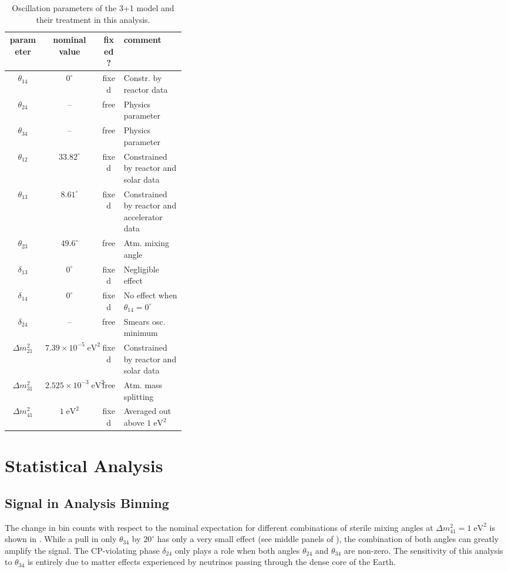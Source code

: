 \begin{table}
    \centering
    \begin{tabular}{@{}cccp{0.35 \linewidth}@{}}\toprule
        \textbf{parameter} & \textbf{nominal value} & \textbf{fixed?} & \textbf{comment} \\
        \midrule
        $\theta_{14}$ & $0^\circ$ & fixed &  Constr. by reactor data \\
        $\theta_{24}$ & -- & free & Physics parameter\\
        $\theta_{34}$ & -- & free & Physics parameter\\
        $\theta_{12}$ & $33.82^\circ$ & fixed & Constrained by reactor and solar data \\
        $\theta_{13}$ & $8.61^\circ$ & fixed & Constrained by reactor and accelerator data \\
        $\theta_{23}$ & $49.6^\circ$ & free & Atm. mixing angle \\
        $\delta_{13}$ & $0^\circ$ & fixed &  Negligible effect \\
        $\delta_{14}$ & $0^\circ$ & fixed &  No effect when $\theta_{14} = 0^\circ$ \\
        $\delta_{24}$ & -- & free & Smears osc. minimum \\
        $\Delta m^2_{21}$ & $7.39\times10^{-5}\;\mathrm{eV^2}$ & fixed & Constrained by reactor and solar data \\
        $\Delta m^2_{31}$ & $2.525\times10^{-3}\;\mathrm{eV^2}$ & free & Atm. mass splitting \\
        $\Delta m^2_{41}$ & $1\;\mathrm{eV^2}$ & fixed & Averaged out above $1\;\mathrm{eV^2}$ \\
        \bottomrule
    \end{tabular}
    \caption{Oscillation parameters of the 3+1 model and their treatment in this analysis.}
    \label{tab:oscillation-parameters}
\end{table}

\section{Statistical Analysis}

\subsection{Signal in Analysis Binning}
The change in bin counts with respect to the nominal expectation for different combinations of sterile mixing angles at $\Delta m^2_{41}=1\;\mathrm{eV^2}$ is shown in . While a pull in only $\theta_{34}$ by $20^\circ$ has only a very small effect (see middle panels of ), the combination of both angles can greatly amplify the signal. The CP-violating phase $\delta_{24}$ only plays a role when both angles $\theta_{24}$ and $\theta_{34}$ are non-zero. The sensitivity of this analysis to $\theta_{34}$ is entirely due to matter effects experienced by neutrinos passing through the dense core of the Earth.

